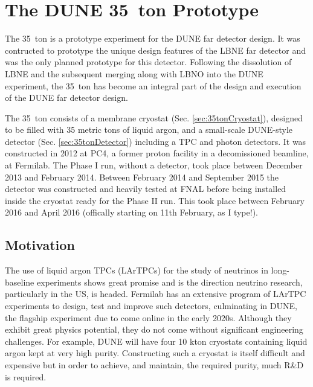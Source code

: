 
\graphicspath{{35ton/Figs/}}

\chapter{The DUNE 35~ton Prototype}\label{sec:35ton}

The 35~ton is a prototype experiment for the DUNE far detector design.  It was contructed to prototype the unique design features of the LBNE far detector and was the only planned prototype for this detector.  Following the dissolution of LBNE and the subsequent merging along with LBNO into the DUNE experiment, the 35~ton has become an integral part of the design and execution of the DUNE far detector design.

The 35~ton consists of a membrane cryostat (Sec. \ref{sec:35tonCryostat}), designed to be filled with 35 metric tons of liquid argon, and a small-scale DUNE-style detector (Sec. \ref{sec:35tonDetector}) including a TPC and photon detectors.  It was constructed in 2012 at PC4, a former proton facility in a decomissioned beamline, at Fermilab.  The Phase I run, without a detector, took place between December 2013 and February 2014.  Between February 2014 and September 2015 the detector was constructed and heavily tested at FNAL before being installed inside the cryostat ready for the Phase II run.  This took place between February 2016 and April 2016 (offically starting on 11th February, as I type!).

\section{Motivation}\label{sec:35tonMotivation}

The use of liquid argon TPCs (LArTPCs) for the study of neutrinos in long-baseline experiments shows great promise and is the direction neutrino research, particularly in the US, is headed.  Fermilab has an extensive program of LArTPC experiments to design, test and improve such detectors, culminating in DUNE, the flagship experiment due to come online in the early 2020s.  Although they exhibit great physics potential, they do not come without significant engineering challenges.  For example, DUNE will have four 10 kton cryostats containing liquid argon kept at very high purity.  Constructing such a cryostat is itself difficult and expensive but in order to achieve, and maintain, the required purity, much R\&D is required.

